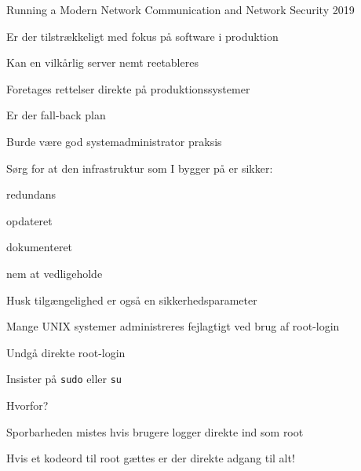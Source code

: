 \documentclass[Screen16to9,17pt,footrule]{foils}
\begin{document}
\mytitlepage
{Running a Modern Network}
{Communication and Network Security 2019}




\begin{list1}
\item Er der tilstrækkeligt med fokus på software i produktion
\item Kan en vilkårlig server nemt reetableres
\item Foretages rettelser direkte på produktionssystemer
\item Er der fall-back plan
\item Burde være god systemadministrator praksis
\end{list1}




\begin{list1}
\item Sørg for at den infrastruktur som I bygger på er sikker:
\begin{list2}
 \item redundans
       \item opdateret
        \item dokumenteret
        \item nem at vedligeholde
\end{list2}

\item  Husk tilgængelighed er også en sikkerhedsparameter
\end{list1}




\begin{list1}
\item Mange UNIX systemer administreres fejlagtigt ved brug af
  root-login
\item Undgå direkte root-login
\item Insister på \verb+sudo+ eller \verb+su+
\item Hvorfor?
\begin{list2}
\item Sporbarheden mistes hvis brugere logger direkte ind som root
\item Hvis et kodeord til root gættes er der direkte adgang til alt!
\end{list2}
\end{list1}

\end{document}
